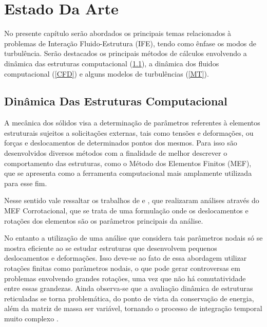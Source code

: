 \documentclass[_ArquivoPrincipal.tex]{subfiles}
\begin{document}
\chapter{Estado Da Arte}
	
No presente capítulo serão abordados os principais temas relacionados à problemas de Interação Fluido-Estrutura (IFE), tendo como ênfase os modos de turbulência. Serão destacados os principais métodos de cálculos envolvendo a dinâmica das estruturas computacional (\ref{CSD}), a dinâmica dos fluidos computacional (\ref{CFD}) e alguns modelos de turbulências (\ref{MT}).

\section{Dinâmica Das Estruturas Computacional} \label{CSD}

A mecânica dos sólidos visa a determinação de parâmetros referentes à elementos estruturais sujeitos a solicitações externas, tais como tensões e deformações, ou forças e deslocamentos de determinados pontos dos mesmos. Para isso são desenvolvidos diversos métodos com a finalidade de melhor descrever o comportamento das estruturas, como o Método dos Elementos Finitos (MEF), que se apresenta como a ferramenta computacional mais amplamente utilizada para esse fim.

Nesse sentido vale ressaltar os trabalhos de  e , que realizaram análises através do MEF Corrotacional, que se trata de uma formulação onde os deslocamentos e rotações dos elementos são os parâmetros principais da análise.

No entanto a utilização de uma análise que considera tais parâmetros nodais só se mostra eficiente ao se estudar estruturas que desenvolvem pequenos deslocamentos e deformações. Isso deve-se ao fato de essa abordagem utilizar rotações finitas como parâmetros nodais, o que pode gerar controversas em problemas envolvendo grandes rotações, uma vez que não há comutatividade entre essas grandezas. Ainda observa-se que a avaliação dinâmica de estruturas reticuladas se torna problemática, do ponto de vista da conservação de energia, além da matriz de massa ser variável, tornando o processo de integração temporal muito complexo \cite{sanches2013unconstrained}.
\end{document}
